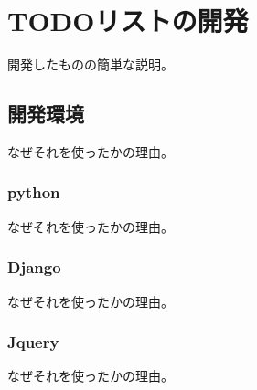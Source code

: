 \chapter{TODOリストの開発}
\label{cha:Development}
開発したものの簡単な説明。

\section{開発環境}
なぜそれを使ったかの理由。

\subsection{python}
なぜそれを使ったかの理由。

\subsection{Django}
なぜそれを使ったかの理由。

\subsection{Jquery}
なぜそれを使ったかの理由。
